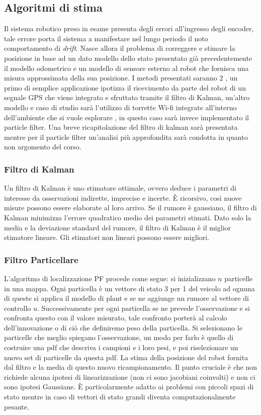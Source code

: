 \subsection{Algoritmi di stima}
Il sistema robotico preso in esame presenta degli errori all'ingresso degli 
encoder, tale errore porta il sistema a manifestare nel lungo periodo il noto 
comportamento di \emph{drift}. Nasce allora il problema di correggere e stimare
la posizione in base ad un dato modello dello stato presentato già 
precedentemente il modello odometrico e un modello di sensore esterno al 
robot che fornisca una misura approssimata della sua posizione. I metodi 
presentati saranno 2 , un primo di semplice applicazione ipotizza il 
ricevimento da parte del robot di un segnale GPS che viene integrato e 
sfruttato tramite il filtro di Kalman, un'altro modello e caso di studio sarà 
l'utilizzo di torrette Wi-fi integrate all'interno dell'ambiente che si vuole 
esplorare , in questo caso sarà invece implementato il particle filter. 
Una breve ricapitolazione del filtro di kalman sarà presentata mentre per il 
particle filter un'analisi più approfondita sarà condotta in quanto non 
argomento del corso.
%
\subsubsection{Filtro di Kalman}
Un filtro di Kalman è uno stimatore ottimale, ovvero deduce i parametri di 
interesse da osservazioni indirette, imprecise e incerte. È ricorsivo, così 
nuove misure possono essere elaborate al loro arrivo. 
Se il rumore è gaussiano, il filtro di Kalman minimizza l'errore quadratico 
medio dei parametri stimati.
Dato solo la media e la deviazione standard del rumore, il filtro di Kalman è 
il miglior stimatore lineare. Gli stimatori non lineari possono essere migliori.
%
\subsubsection{Filtro Particellare}
%
L'algoritmo di localizzazione PF procede come segue: si inizializzano $n$ 
particelle in una mappa.
Ogni particella è un vettore di stato 3 per 1 del veicolo ad ognuna di queste 
si applica il modello di plant e se ne aggiunge un rumore al vettore di controllo $u$. 
Successivamente per ogni particella se ne prevede l'osservazione e si confronta 
questo con il valore misurato, tale confronto porterà al calcolo 
dell'innovazione o di ciò che definiremo peso della particella.
Si selezionano le particelle che meglio spiegano l'osservazione, un modo per 
farlo è quello di costruire una pdf che descriva i campioni e i loro pesi, e 
poi riselezionare un nuovo set di particelle da questa pdf.
La stima della posizione del robot fornita dal filtro e la media di questo 
nuovo ricampionamento. %
%
Il punto cruciale è che non richiede alcuna ipotesi di linearizzazione (non ci 
sono jacobiani coinvolti) e non ci sono ipotesi Gaussiane. È particolarmente 
adatto ai problemi con piccoli spazi di stato mentre in caso di vettori di 
stato grandi diventa computazionalmente pesante.
